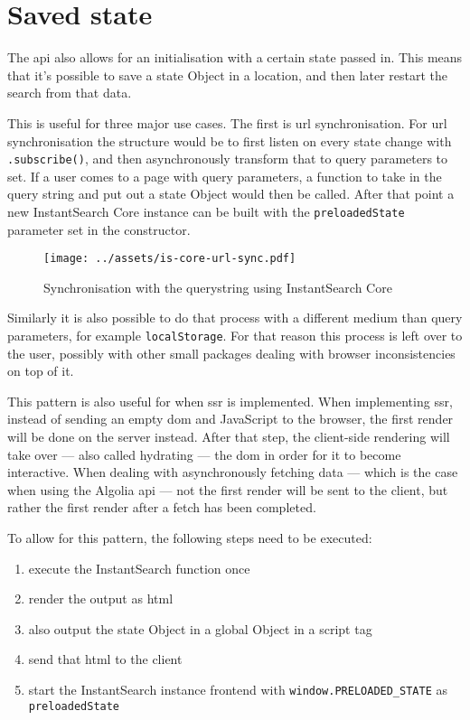 
\section{Saved state} %
\label{sec:saved_state}

The \acrshort{api} also allows for an initialisation with a certain state passed in. This means that it's possible to save a state Object in a location, and then later restart the search from that data. 

This is useful for three major use cases. The first is \acrshort{url} synchronisation. For \acrshort{url} synchronisation the structure would be to first listen on every state change with {\tt .subscribe()}, and then asynchronously transform that to query parameters to set. If a user comes to a page with query parameters, a function to take in the query string and put out a state Object would then be called. After that point a new InstantSearch Core instance can be built with the {\tt preloadedState} parameter set in the constructor.

\begin{figure}[H]
  \centering
  \texttt{[image: ../assets/is-core-url-sync.pdf]}
  \caption{Synchronisation with the querystring using InstantSearch Core}
  \label{figure:is-core-url-sync}
\end{figure}

Similarly it is also possible to do that process with a different medium than query parameters, for example {\tt localStorage}. For that reason this process is left over to the user, possibly with other small packages dealing with browser inconsistencies on top of it. 

This pattern is also useful for when \acrfull{ssr} is implemented. When implementing \acrlong{ssr}, instead of sending an empty \acrshort{dom} and JavaScript to the browser, the first render will be done on the server instead. After that step, the client-side rendering will take over --- also called hydrating --- the \acrshort{dom} in order for it to become interactive. When dealing with asynchronously fetching data --- which is the case when using the Algolia \acrshort{api} --- not the first render will be sent to the client, but rather the first render after a fetch has been completed.

To allow for this pattern, the following steps need to be executed:

\begin{enumerate}
  \item execute the InstantSearch function once
  \item render the output as \acrshort{html}
  \item also output the state Object in a global Object in a script tag
  \item send that \acrshort{html} to the client
  \item start the InstantSearch instance frontend with {\tt window.PRELOADED\_STATE} as {\tt preloadedState}
\end{enumerate}

